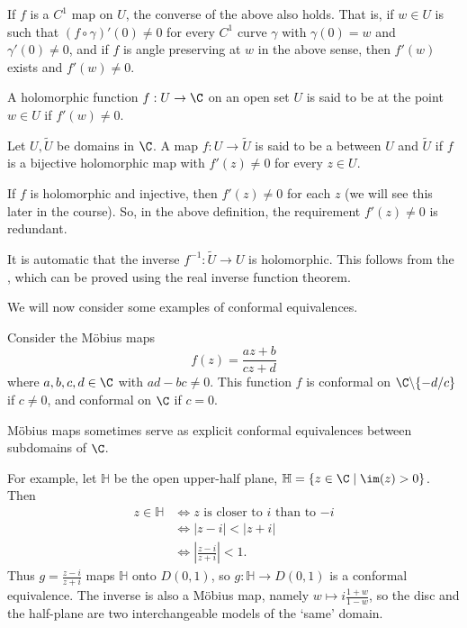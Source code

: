 \begin{remark}
    If $f$ is a $C^1$ map on $U$, the converse of the above also holds. That is, if $w \in U$ is such that $(f \circ \gamma)'(0) \neq 0$ for every $C^1$ curve $\gamma$ with $\gamma(0) = w$ and $\gamma'(0) \neq 0$, and if $f$ is angle preserving at $w$ in the above sense, then $f'(w)$ exists and $f'(w) \neq 0$.
\end{remark}

\begin{definition}[Conformal]
    A holomorphic function $f: U \rightarrow \C$ on an open set $U$ is said to be  at the point $w \in U$ if $f'(w) \neq 0$.
\end{definition}

\begin{definition}
    Let $U, \tilde{U}$ be domains in $\C$. A map $f: U \rightarrow \tilde{U}$ is said to be a  between $U$ and $\tilde{U}$ if $f$ is a bijective holomorphic map with $f'(z) \neq 0$ for every $z \in U$.
\end{definition}

\begin{remark}[Redundancy]
    If $f$ is holomorphic and injective, then $f'(z) \neq 0$ for each $z$ (we will see this later in the course). So, in the above definition, the requirement $f'(z) \neq 0$ is redundant.
\end{remark}

\begin{remark}
    It is automatic that the inverse $f^{-1}: \tilde{U} \rightarrow U$ is holomorphic. This follows from the , which can be proved using the real inverse function theorem.
\end{remark}

We will now consider some examples of conformal equivalences.

\begin{example}
    Consider the Möbius maps
    $$
f(z) = \frac{az + b}{cz + d}
    $$
    where $a, b, c, d \in \C$ with $ad - bc \neq 0$. This function $f$ is conformal on $\C \backslash \{-d/c\}$ if $c \neq 0$, and conformal on $\C$ if $c = 0$.

    Möbius maps sometimes serve as explicit conformal equivalences between subdomains of $\C$.

    For example, let $\mathbb{H}$ be the open upper-half plane, $\mathbb{H} = \{z \in \C \mid \im(z) > 0\}$. Then
    \begin{align*}
        z \in \mathbb{H} &\iff z \text{ is closer to $i$ than to $-i$} \\
&\iff |z - i| < |z + i| \\
&\iff \left|\frac{z - i}{z + i}\right| < 1.
    \end{align*}
    Thus $g = \frac{z - i}{z + i}$ maps $\mathbb{H}$ onto $D(0, 1)$, so $g: \mathbb{H} \rightarrow D(0, 1)$ is a conformal equivalence. The inverse is also a Möbius map, namely $w \mapsto i\frac{1 + w}{1 - w}$, so the disc and the half-plane are two interchangeable models of the `same' domain.
\end{example}

